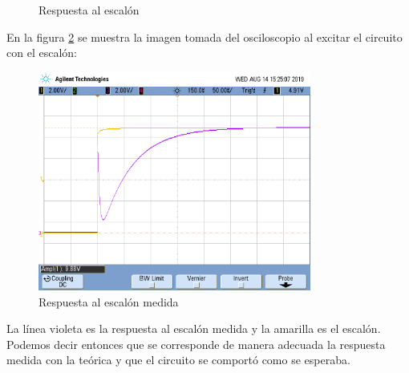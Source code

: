 \begin{figure}[H] 
\begin{center}
\caption{Respuesta al escalón}
\label{respuestaalescalon}
\end{center}
\end{figure}



En la figura \ref{rtaalescalonosciloscopio} se muestra la imagen tomada del osciloscopio al excitar el circuito con el escalón:

\begin{figure}[H]                                                       
    \centering\includegraphics[width=0.8\textwidth]{resources/rtaalescalon.png}
    \caption{Respuesta al escalón medida}
\label{rtaalescalonosciloscopio}
\end{figure}

La línea violeta es la respuesta al escalón medida y la amarilla es el escalón. Podemos decir entonces que se corresponde de manera adecuada la respuesta medida con la teórica y que el circuito se comportó como se esperaba.
 
%